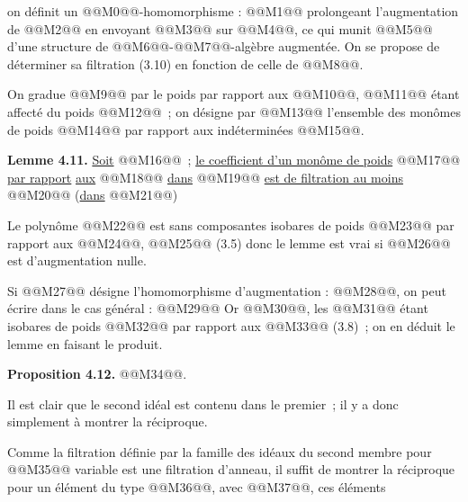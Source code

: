 
on
définit un @@M0@@-homomorphisme : @@M1@@ prolongeant l'augmentation de @@M2@@ en envoyant @@M3@@ sur @@M4@@, ce qui munit @@M5@@ d'une structure de @@M6@@-@@M7@@-algèbre augmentée. On se propose de déterminer sa filtration (3.10) en fonction de celle de @@M8@@.

On gradue @@M9@@ par le poids par rapport aux @@M10@@, @@M11@@ étant affecté du poids @@M12@@~; on désigne par @@M13@@ l'ensemble des monômes de poids @@M14@@ par rapport aux indéterminées @@M15@@.

\textbf{Lemme 4.11.} \uline{Soit} @@M16@@~; \uline{le coefficient d'un monôme de poids} @@M17@@ \uline{par rapport} \uline{aux} @@M18@@ \uline{dans} @@M19@@ \uline{est de filtration au moins} @@M20@@ (\uline{dans} @@M21@@)

Le polynôme @@M22@@ est sans composantes isobares de poids @@M23@@ par rapport aux @@M24@@, @@M25@@ (3.5) donc le lemme est vrai si @@M26@@ est d'augmentation nulle.

Si @@M27@@ désigne l'homomorphisme d'augmentation : @@M28@@, on peut écrire dans le cas général :
@@M29@@
Or @@M30@@, les @@M31@@ étant isobares de poids @@M32@@ par rapport aux @@M33@@ (3.8)~; on en déduit le lemme en faisant le produit.

\textbf{Proposition 4.12.} @@M34@@.

Il est clair que le second idéal est contenu dans le premier~; il y a donc simplement à montrer la réciproque.

Comme la filtration définie par la famille des idéaux du second membre pour @@M35@@ variable est une filtration d'anneau, il suffit de montrer la réciproque pour un élément du type @@M36@@, avec @@M37@@, ces éléments
